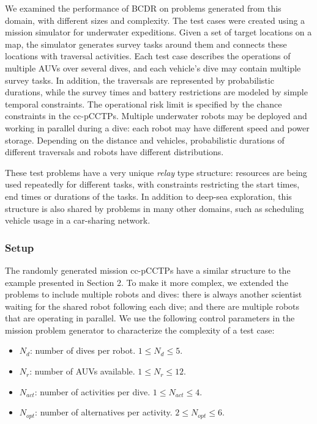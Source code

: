 \documentclass[jair,twoside,11pt,theapa]{article}
\begin{document}
We examined the performance of BCDR on problems generated from this domain, with
different sizes and complexity. The test cases were created using a mission
simulator for underwater expeditions. Given a set of target locations on a map,
the simulator generates survey tasks around them and connects these locations
with traversal activities. Each test case describes the operations of multiple
AUVs over several dives, and each vehicle's dive may contain multiple survey
tasks. In addition, the traversals are represented by probabilistic durations,
while the survey times and battery restrictions are modeled by simple temporal
constraints. The operational risk limit is specified by the chance constraints
in the cc-pCCTPs. Multiple underwater robots may be deployed and working in
parallel during a dive: each robot may have different speed and power storage.
Depending on the distance and vehicles, probabilistic durations of different
traversals and robots have different distributions.


These test problems have a very unique \textit{relay} type structure: resources
are being used repeatedly for different tasks, with constraints restricting the
start times, end times or durations of the tasks. In addition to deep-sea
exploration, this structure is also shared by problems in many other domains,
such as scheduling vehicle usage in a car-sharing network.


\subsubsection{Setup}


The randomly generated mission cc-pCCTPs have a similar structure to the example
presented in Section 2. To make it more complex, we extended the problems to
include multiple robots and dives: there is always another scientist waiting for
the shared robot following each dive; and there are multiple robots that are
operating in parallel. We use the following control parameters in the mission
problem generator to characterize the complexity of a test case:


\begin{itemize}
	\item $N_d$: number of dives per robot. $1\leq N_d\leq 5$.
	\item $N_r$: number of AUVs available. $1\leq N_r\leq 12$.
	\item $N_{act}$: number of activities per dive. $1\leq N_{act}\leq 4$.
	\item $N_{opt}$: number of alternatives per activity. $2\leq N_{opt}\leq 6$.
\end{itemize}
\end{document}
